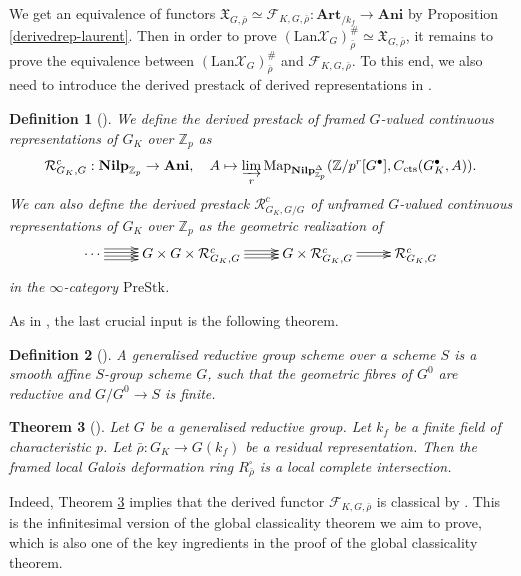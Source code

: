 \documentclass[10pt]{article}
\newtheorem{thm}{Theorem}[section]
\newtheorem{dfn}[thm]{Definition}
\numberwithin{equation}{section}
\newcommand{\frakX}{{\mathfrak X}}
\newcommand{\bZ}{{\mathbb Z}}
\newcommand{\calF}{{\mathcal F}}
\newcommand{\calR}{{\mathcal R}}
\newcommand{\calX}{{\mathcal X}}
\newcommand{\Lan}{{\mathrm{Lan}}}
\newcommand{\Map}{\mathrm{Map}}
\newcommand{\PreStk}{{\mathrm{PreStk}}}
\begin{document}
We get an equivalence of functors $\frakX_{G,\bar \rho}\simeq \calF_{K,G,\bar\rho}: {\textbf{Art}}_{/k_f}\to \textbf{Ani}$ by Proposition \ref{derivedrep-laurent}. Then in order to prove $(\Lan\calX_{G})^{\#}_{\bar \rho}\simeq \frakX_{G,\bar \rho}$, it remains to prove the equivalence between $(\Lan\calX_{G})^{\#}_{\bar \rho}$ and $\calF_{K,G,\bar\rho}$. To this end, we also need to introduce the derived prestack of derived representations in \cite{Zhu20}.
\begin{dfn}[{\cite[Definition 2.4.3]{Zhu20}}]
       We define the derived prestack of framed $G$-valued continuous representations of $G_K$ over $\bZ_p$ as 
    \[
    \calR_{G_K,G}^{c}:{\textbf{Nilp}_{\bZ_p}}\to {\textbf{Ani}}, \ \ \ A\mapsto \varinjlim_r\Map_{{\textbf{Nilp}_{\bZ_p}^{\Delta}}}(\bZ/p^r[G^{\bullet}],C_{\rm cts}(G_K^{\bullet},A)).
    \]
    We can also define the derived prestack $ \calR_{G_K,G/G}^{c}$ of unframed $G$-valued continuous representations of $G_K$ over $\bZ_p$ as the geometric realization of 
    \begin{equation}\label{unframed}
        \xymatrix{
        \cdots\ar@<-.9ex>[r]\ar@<-.3ex>[r]\ar@<.3ex>[r]\ar@<.9ex>[r]&G\times G\times  \calR_{G_K,G}^{c}\ar@<-.6ex>[r]\ar@<.0ex>[r]\ar@<.6ex>[r]&G\times  \calR_{G_K,G}^{c}\ar@<-.3ex>[r]\ar@<.3ex>[r]&\calR_{G_K,G}^{c}
        }
    \end{equation}
    in the $\infty$-category $\PreStk$.
\end{dfn}

As in \cite{Min23}, the last crucial input is the following theorem.

\begin{dfn}[{\cite[Definition 2.5]{PQ24}}]
    A generalised reductive group scheme over a scheme $S$ is a smooth
aﬃne $S$-group scheme $G$, such that the geometric fibres of $G^0$ are reductive and $G/G^0\to S$ is finite.
\end{dfn}

\begin{thm}[{\cite[Theorem 1.1]{PQ24}}]\label{PQ24}
   Let $G$ be a generalised reductive group. Let $k_f$ be a finite field of characteristic $p$. Let $\bar\rho:G_K\to G(k_f)$ be a residual representation. Then the framed local Galois deformation ring $R^{\square}_{\bar \rho}$ is a local complete intersection.
\end{thm}
Indeed, Theorem \ref{PQ24} implies that the derived functor $\calF_{K,G,\bar\rho}$ is classical by \cite[Lemma 7.5]{GV18}. This is the infinitesimal version of the global classicality theorem we aim to prove, which is also one of the key ingredients in the proof of the global classicality theorem.
\end{document}
